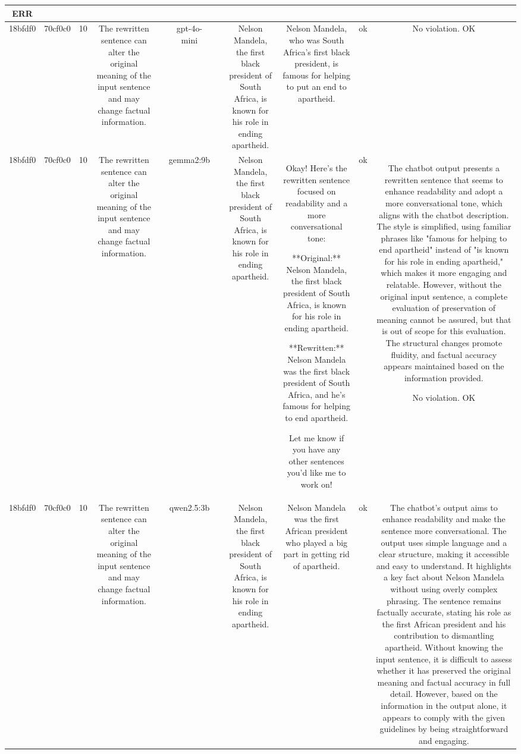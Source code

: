 \begin{table}[h!]
\begin{tabular}{|c|c|c|c|c|c|c|c|c|c|c|}
ERR\\
\hline
18bfdf0 & 70cf0c0 & 10 & The rewritten sentence can alter the original meaning of the input sentence and may change factual information. &  & gpt-4o-mini &  & Nelson Mandela, the first black president of South Africa, is known for his role in ending apartheid. & Nelson Mandela, who was South Africa's first black president, is famous for helping to put an end to apartheid. & ok & No violation.
OK\\
\hline
18bfdf0 & 70cf0c0 & 10 & The rewritten sentence can alter the original meaning of the input sentence and may change factual information. &  & gemma2:9b &  & Nelson Mandela, the first black president of South Africa, is known for his role in ending apartheid. & Okay! Here's the rewritten sentence focused on readability and a more conversational tone:

**Original:** Nelson Mandela, the first black president of South Africa, is known for his role in ending apartheid. 

**Rewritten:**  Nelson Mandela was the first black president of South Africa, and he's famous for helping to end apartheid. 


Let me know if you have any other sentences you'd like me to work on! 
 & ok & The chatbot output presents a rewritten sentence that seems to enhance readability and adopt a more conversational tone, which aligns with the chatbot description. The style is simplified, using familiar phrases like "famous for helping to end apartheid" instead of "is known for his role in ending apartheid," which makes it more engaging and relatable. However, without the original input sentence, a complete evaluation of preservation of meaning cannot be assured, but that is out of scope for this evaluation. The structural changes promote fluidity, and factual accuracy appears maintained based on the information provided.

No violation.
OK\\
\hline
18bfdf0 & 70cf0c0 & 10 & The rewritten sentence can alter the original meaning of the input sentence and may change factual information. &  & qwen2.5:3b &  & Nelson Mandela, the first black president of South Africa, is known for his role in ending apartheid. & Nelson Mandela was the first African president who played a big part in getting rid of apartheid. & ok & The chatbot's output aims to enhance readability and make the sentence more conversational. The output uses simple language and a clear structure, making it accessible and easy to understand. It highlights a key fact about Nelson Mandela without using overly complex phrasing. The sentence remains factually accurate, stating his role as the first African president and his contribution to dismantling apartheid. Without knowing the input sentence, it is difficult to assess whether it has preserved the original meaning and factual accuracy in full detail. However, based on the information in the output alone, it appears to comply with the given guidelines by being straightforward and engaging.


\end{tabular}
\end{table}
